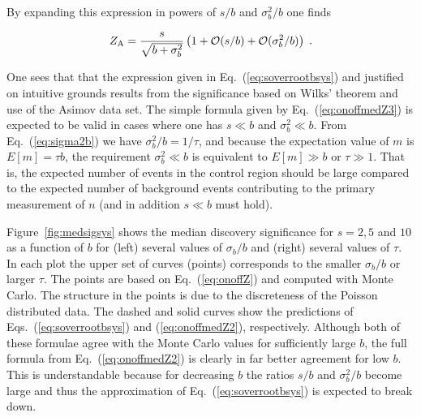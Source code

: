 \documentclass[11pt]{article}
\begin{document}
\noindent By expanding this expression in powers of $s/b$ and
$\sigma_b^2/b$ one finds

\begin{equation}
\label{eq:onoffmedZ3}
Z_{\rm A} = \frac{s}{\sqrt{b + \sigma_b^2}} \left( 1 + {\cal O}(s/b)
+ {\cal O}(\sigma_b^2/b) \right) \;.
\end{equation}

One sees that that the expression given in
Eq.~(\ref{eq:soverrootbsys}) and justified on intuitive grounds
results from the significance based on Wilks' theorem and use of the
Asimov data set.  The simple formula given by
Eq.~(\ref{eq:onoffmedZ3}) is expected to be valid in cases where one
has $s \ll b$ and $\sigma_b^2 \ll b$.  From Eq.~(\ref{eq:sigma2b}) we
have $\sigma_b^2/b = 1/\tau$, and because the expectation value of $m$
is $E[m] = \tau b$, the requirement $\sigma_b^2 \ll b$ is equivalent
to $E[m] \gg b$ or $\tau \gg 1$.  That is, the expected number of
events in the control region should be large compared to the expected
number of background events contributing to the primary measurement of
$n$ (and in addition $s \ll b$ must hold).

Figure~\ref{fig:medsigsys} shows the median discovery significance for
$s = 2, 5$ and $10$ as a function of $b$ for (left) several values of
$\sigma_b/b$ and (right) several values of $\tau$.  In each plot the
upper set of curves (points) corresponds to the smaller $\sigma_b/b$
or larger $\tau$.  The points are based on Eq.~(\ref{eq:onoffZ}) and
computed with Monte Carlo.  The structure in the points is due to the
discreteness of the Poisson distributed data.  The dashed and solid
curves show the predictions of Eqs.~(\ref{eq:soverrootbsys}) and
(\ref{eq:onoffmedZ2}), respectively.  Although both of these formulae
agree with the Monte Carlo values for sufficiently large $b$, the full
formula from Eq.~(\ref{eq:onoffmedZ2}) is clearly in far better
agreement for low $b$.  This is understandable because for decreasing
$b$ the ratios $s/b$ and $\sigma_b^2/b$ become large and thus the
approximation of Eq.~(\ref{eq:soverrootbsys}) is expected to break
down.
\end{document}
